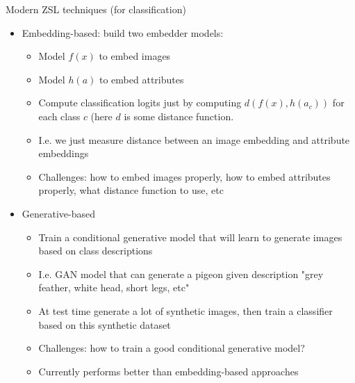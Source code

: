 \documentclass[handout, 10pt]{beamer}
\begin{document}
\begin{frame}{Modern ZSL techniques (for classification)}
    \begin{itemize}
        \item\pause Embedding-based: build two embedder models:
        \begin{itemize}
            \item\pause Model $f(x)$ to embed images
            \item\pause Model $h(a)$ to embed attributes
            \item\pause Compute classification logits just by computing $d(f(x), h(a_c))$ for each class $c$ (here $d$ is some distance function.
            \item\pause I.e. we just measure distance between an image embedding and attribute embeddings
            \item\pause Challenges: how to embed images properly, how to embed attributes properly, what distance function to use, etc
        \end{itemize}
        \item\pause Generative-based
        \begin{itemize}
            \item\pause Train a conditional generative model that will learn to generate images based on class descriptions
            \item\pause I.e. GAN model that can generate a pigeon given description "grey feather, white head, short legs, etc"
            \item\pause At test time generate a lot of synthetic images, then train a classifier based on this synthetic dataset
            \item\pause Challenges: how to train a good conditional generative model?
            \item\pause Currently performs better than embedding-based approaches
        \end{itemize}
    \end{itemize}
\end{frame}
\end{document}

